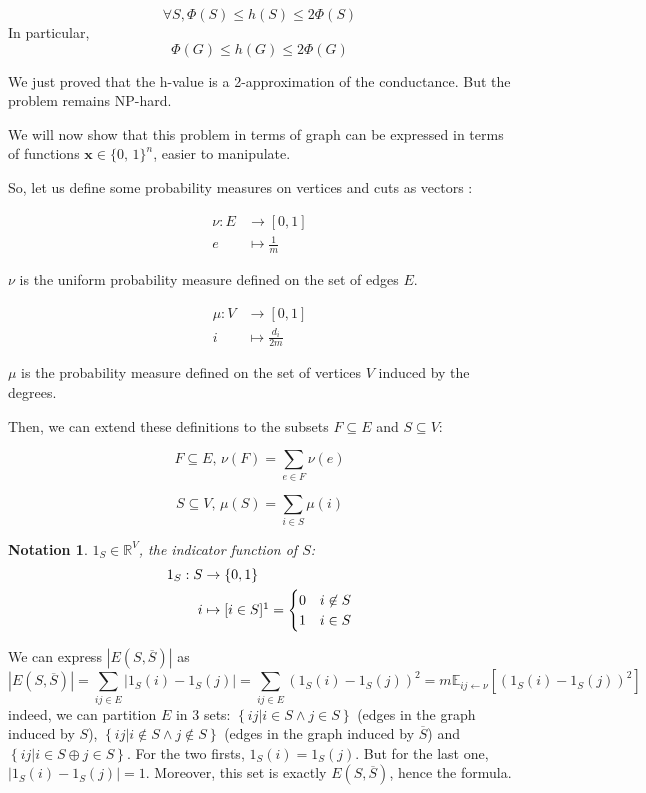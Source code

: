 \documentclass[12pt]{article}
\newtheorem{notation}{Notation}
\newcommand{\EE}{\mathbb{E}}
\newcommand{\RR}{\mathbb{R}}
\newcommand{\set}[1]{\left\{ #1 \right\}}
\newcommand{\card}[1]{\left\lvert#1\right\rvert}
\newcommand{\NP}{\textsc{NP}}
\begin{document}
\[
    \forall S, \Phi(S) \leqslant h(S) \leqslant 2 \Phi(S)
\]
In particular,
\[
    \Phi(G) \leqslant h(G) \leqslant 2 \Phi(G)
\]

We just proved that the h-value is a 2-approximation of the conductance. But the problem remains \NP-hard.

\bigskip

We will now show that this problem in terms of graph can be expressed in terms of functions $\textbf{x} \in \{0,\,1\}^{n}$, easier to manipulate.

So, let us define some probability measures on vertices and cuts as vectors :

\[
    \begin{aligned}
        \nu : E &\to [0,1] \\
           e &\mapsto \frac{1}{m}
    \end{aligned}
\]

$\nu$ is the uniform probability measure defined on the set of edges $E$.

\[
    \begin{aligned}
        \mu : V&\to [0,1]\\
        i &\mapsto \frac{d_i}{2m}
    \end{aligned}
\]

$\mu$ is the probability measure defined on the set of vertices $V$ induced by the degrees.

Then, we can extend these definitions to the subsets $F \subseteq E$ and $S \subseteq V$:

\[
    F\subseteq E,\, \nu(F) = \sum\limits_{e\in F} \nu(e)
\]

\[
    S\subseteq V,\, \mu(S) = \sum\limits_{i\in S} \mu(i)
\]

\begin{notation}
    $1_S \in \RR^V$, the indicator function of $S$:
    \[
        \begin{aligned}
            1_S: S &\to \set{0,1}\\
            i &\mapsto [i\in S]\footnotemark
            = \begin{cases}
                    0 & i\not\in S\\
                    1 & i\in S
                \end{cases}     
        \end{aligned}
    \]
\end{notation}

We can express $\card{E(S,\overline{S})}$ as
\[
    \card{E(S,\overline{S})} = \sum\limits_{ij\in E} \lvert 1_S(i)-1_S(j)\rvert = \sum\limits_{ij\in E} \left( 1_S(i)-1_S(j)\right)^2 = m \EE_{ij \leftarrow \nu} \left[ \left( 1_S(i)-1_S(j)\right)^2 \right]
\]
indeed, we can partition $E$ in 3 sets: $\set{ij \vert i\in S \wedge j \in S}$ (edges in the graph induced by $S$), $\set{ij \vert i\not\in S \wedge j \not\in S}$ (edges in the graph induced by $\overline{S}$) and $\set{ij \vert i\in S \oplus j \in S}$. For the two firsts, $1_S(i) = 1_S(j)$. But for the last one, $\lvert 1_S(i) - 1_S(j)\rvert = 1$. Moreover, this set is exactly $E(S,\overline{S})$, hence the formula.
\end{document}
